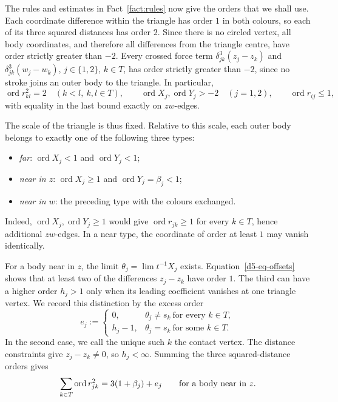 \documentclass[Threeside,11pt]{article}
\theoremstyle{definition}
\theoremstyle{remark}
\numberwithin{equation}{section}
\theoremstyle{remark}
\newcommand{\ord}{\operatorname{ord}}
\begin{document}
{The rules and estimates in Fact~\ref{fact:rules} now give the orders that we
shall use.  Each coordinate difference within the triangle has order $1$ in
both colours, so each of its three squared distances has order $2$.
Since there is no circled vertex, all body coordinates, and therefore all
differences from the triangle centre, have order strictly greater than $-2$.
Every crossed
force term $\delta_{jk}^3(z_j-z_k)$ and $\delta_{jk}^3(w_j-w_k)$, $j\in\{1,2\}$,
$k\in T$, has order strictly greater than $-2$, since no stroke joins an outer
body to the triangle.  In particular,
\[
 \ord r_{kl}^2=2\quad(k<l,\ k,l\in T),\qquad
 \ord X_j,\ord Y_j>-2\quad(j=1,2),\qquad
 \ord r_{ij}\le1,
\]
with equality in the last bound exactly on $zw$-edges.

The scale of the triangle is thus fixed.  Relative to this scale, each outer
body belongs to exactly one of the following three types:
\begin{itemize}
 \item \emph{far}: $\ord X_j<1$ and $\ord Y_j<1$;
 \item \emph{near in $z$}: $\ord X_j\ge1$ and $\ord Y_j=\beta_j<1$;
 \item \emph{near in $w$}: the preceding type with the colours exchanged.
\end{itemize}
Indeed, $\ord X_j,\ord Y_j\ge1$ would give $\ord r_{jk}\ge1$
for every $k\in T$, hence additional $zw$-edges. In a near type, the coordinate
of order at least $1$ may vanish identically.

For a body near in $z$, the limit $\theta_j=\lim t^{-1}X_j$ exists.
Equation~\eqref{d5-eq-offsets} shows that at least two of the differences
$z_j-z_k$ have order $1$.  The third can have a higher order $h_j>1$ only
when its leading coefficient vanishes at one triangle vertex.  We record this distinction by the excess order
\[
 e_j:=\begin{cases}
 0,&\theta_j\ne s_k\ \text{for every }k\in T,\\
 h_j-1,&\theta_j=s_k\ \text{for some }k\in T.
 \end{cases}
\]
In the second case, we call the unique such $k$ the contact vertex.
The distance constraints give $z_j-z_k\ne0$, so $h_j<\infty$.  Summing
the three squared-distance orders gives
\begin{equation*}
 \sum_{k\in T}\ord r_{jk}^2=3(1+\beta_j)+e_j
 \qquad\hbox{for a body near in }z.
\end{equation*}

}
\end{document}
